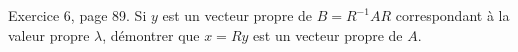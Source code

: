 \begin{exercice}\label{exoLineraire0034}

	Exercice 6, page 89. Si $y$ est un vecteur propre de $B=R^{-1} AR$ correspondant à la valeur propre $\lambda$, démontrer que $x=Ry$ est un vecteur propre de $A$.

\end{exercice}
